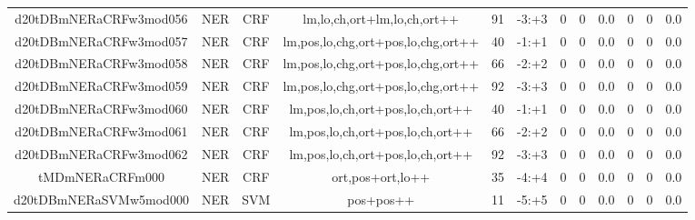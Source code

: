 \documentclass[a4paper]{article}
\begin{document}
\begin{landscape}
\begin{center}
\begin{tabular}{ |c|c|c|c|c|c|c|c|c|c|c|c|}
 
 	
 	\small{ d20tDBmNERaCRFw3mod056 } & \small{ NER} & \small{  CRF }  & lm,lo,ch,ort+lm,lo,ch,ort++  &  91 &  \small{  -3:+3 }  &  0 & 0 & 0.0  &  0 & 0 & 0.0 \\
 	

 
 	
 	\small{ d20tDBmNERaCRFw3mod057 } & \small{ NER} & \small{  CRF }  & lm,pos,lo,chg,ort+pos,lo,chg,ort++  &  40 &  \small{  -1:+1 }  &  0 & 0 & 0.0  &  0 & 0 & 0.0 \\
 	

 
 	
 	\small{ d20tDBmNERaCRFw3mod058 } & \small{ NER} & \small{  CRF }  & lm,pos,lo,chg,ort+pos,lo,chg,ort++  &  66 &  \small{  -2:+2 }  &  0 & 0 & 0.0  &  0 & 0 & 0.0 \\
 	

 
 	
 	\small{ d20tDBmNERaCRFw3mod059 } & \small{ NER} & \small{  CRF }  & lm,pos,lo,chg,ort+pos,lo,chg,ort++  &  92 &  \small{  -3:+3 }  &  0 & 0 & 0.0  &  0 & 0 & 0.0 \\
 	

 
 	
 	\small{ d20tDBmNERaCRFw3mod060 } & \small{ NER} & \small{  CRF }  & lm,pos,lo,ch,ort+pos,lo,ch,ort++  &  40 &  \small{  -1:+1 }  &  0 & 0 & 0.0  &  0 & 0 & 0.0 \\
 	

 
 	
 	\small{ d20tDBmNERaCRFw3mod061 } & \small{ NER} & \small{  CRF }  & lm,pos,lo,ch,ort+pos,lo,ch,ort++  &  66 &  \small{  -2:+2 }  &  0 & 0 & 0.0  &  0 & 0 & 0.0 \\
 	

 
 	
 	\small{ d20tDBmNERaCRFw3mod062 } & \small{ NER} & \small{  CRF }  & lm,pos,lo,ch,ort+pos,lo,ch,ort++  &  92 &  \small{  -3:+3 }  &  0 & 0 & 0.0  &  0 & 0 & 0.0 \\
 	

 
 	
 	\small{ tMDmNERaCRFm000 } & \small{ NER} & \small{  CRF }  & ort,pos+ort,lo++  &  35 &  \small{  -4:+4 }  &  0 & 0 & 0.0  &  0 & 0 & 0.0 \\
 	

 
 	
 	\small{ d20tDBmNERaSVMw5mod000 } & \small{ NER} & \small{  SVM }  & pos+pos++  &  11 &  \small{  -5:+5 }  &  0 & 0 & 0.0  &  0 & 0 & 0.0 \\
 	


\end{tabular}
\end{center}
\end{landscape}
\end{document}
